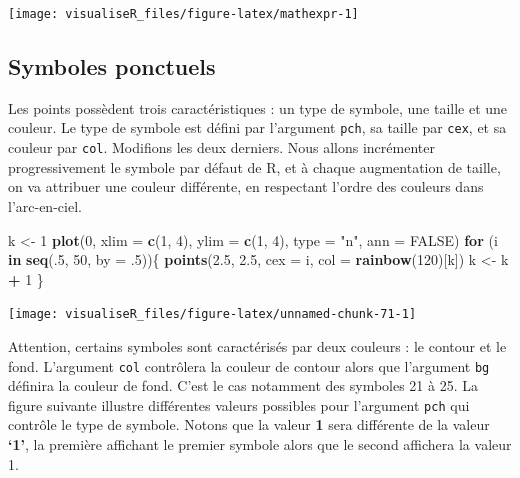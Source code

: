 \documentclass[]{article}
\newenvironment{Shaded}{\begin{snugshade}}{\end{snugshade}}
\newcommand{\ControlFlowTok}[1]{\textcolor[rgb]{0.13,0.29,0.53}{\textbf{#1}}}
\newcommand{\DataTypeTok}[1]{\textcolor[rgb]{0.13,0.29,0.53}{#1}}
\newcommand{\DecValTok}[1]{\textcolor[rgb]{0.00,0.00,0.81}{#1}}
\newcommand{\FloatTok}[1]{\textcolor[rgb]{0.00,0.00,0.81}{#1}}
\newcommand{\KeywordTok}[1]{\textcolor[rgb]{0.13,0.29,0.53}{\textbf{#1}}}
\newcommand{\NormalTok}[1]{#1}
\newcommand{\OperatorTok}[1]{\textcolor[rgb]{0.81,0.36,0.00}{\textbf{#1}}}
\newcommand{\OtherTok}[1]{\textcolor[rgb]{0.56,0.35,0.01}{#1}}
\newcommand{\StringTok}[1]{\textcolor[rgb]{0.31,0.60,0.02}{#1}}
\begin{document}
\begin{center}\texttt{[image: visualiseR\_files/figure-latex/mathexpr-1]} \end{center}

\hypertarget{symboles-ponctuels}{%
\subsection{Symboles ponctuels}\label{symboles-ponctuels}}

Les points possèdent trois caractéristiques : un type de symbole, une taille et
une couleur. Le type de symbole est défini par l'argument \texttt{pch}, sa taille par
\texttt{cex}, et sa couleur par \texttt{col}. Modifions les deux derniers. Nous allons
incrémenter progressivement le symbole par défaut de R, et à chaque augmentation
de taille, on va attribuer une couleur différente, en respectant l'ordre des
couleurs dans l'arc-en-ciel.

\begin{Shaded}
\begin{Highlighting}[]
\NormalTok{k <-}\StringTok{ }\DecValTok{1}
\KeywordTok{plot}\NormalTok{(}\DecValTok{0}\NormalTok{, }\DataTypeTok{xlim =} \KeywordTok{c}\NormalTok{(}\DecValTok{1}\NormalTok{, }\DecValTok{4}\NormalTok{), }\DataTypeTok{ylim =} \KeywordTok{c}\NormalTok{(}\DecValTok{1}\NormalTok{, }\DecValTok{4}\NormalTok{), }\DataTypeTok{type =} \StringTok{"n"}\NormalTok{, }\DataTypeTok{ann =} \OtherTok{FALSE}\NormalTok{)}
\ControlFlowTok{for}\NormalTok{ (i }\ControlFlowTok{in} \KeywordTok{seq}\NormalTok{(.}\DecValTok{5}\NormalTok{, }\DecValTok{50}\NormalTok{, }\DataTypeTok{by =} \FloatTok{.5}\NormalTok{))\{}
\KeywordTok{points}\NormalTok{(}\FloatTok{2.5}\NormalTok{, }\FloatTok{2.5}\NormalTok{, }\DataTypeTok{cex =}\NormalTok{ i, }\DataTypeTok{col =} \KeywordTok{rainbow}\NormalTok{(}\DecValTok{120}\NormalTok{)[k])}
\NormalTok{k <-}\StringTok{ }\NormalTok{k }\OperatorTok{+}\StringTok{ }\DecValTok{1}
\NormalTok{\}}
\end{Highlighting}
\end{Shaded}

\begin{center}\texttt{[image: visualiseR\_files/figure-latex/unnamed-chunk-71-1]} \end{center}

Attention, certains symboles sont caractérisés par deux couleurs : le contour et
le fond. L'argument \texttt{col} contrôlera la couleur de contour alors que l'argument
\texttt{bg} définira la couleur de fond. C'est le cas notamment des symboles 21 à 25.
La figure suivante illustre différentes valeurs possibles pour l'argument \texttt{pch}
qui contrôle le type de symbole. Notons que la valeur \textbf{1} sera différente de
la valeur \textbf{`1'}, la première affichant le premier symbole alors que le second
affichera la valeur 1.
\end{document}
